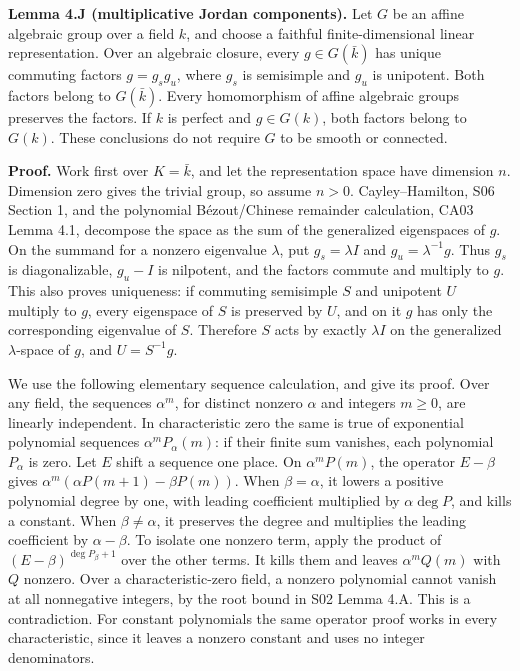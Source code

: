 \documentclass[11pt,a4paper,openany]{report}
\begin{document}
\textbf{Lemma 4.J (multiplicative Jordan components).} Let \(G\) be an affine algebraic group over a field \(k\), and choose a faithful finite-dimensional linear representation. Over an algebraic closure, every \(g\in G(\bar k)\) has unique commuting factors \(g=g_sg_u\), where \(g_s\) is semisimple and \(g_u\) is unipotent. Both factors belong to \(G(\bar k)\). Every homomorphism of affine algebraic groups preserves the factors. If \(k\) is perfect and \(g\in G(k)\), both factors belong to \(G(k)\). These conclusions do not require \(G\) to be smooth or connected.

\textbf{Proof.} Work first over \(K=\bar k\), and let the representation space have dimension \(n\). Dimension zero gives the trivial group, so assume \(n>0\). Cayley--Hamilton, S06 Section 1, and the polynomial Bézout/Chinese remainder calculation, CA03 Lemma 4.1, decompose the space as the sum of the generalized eigenspaces of \(g\). On the summand for a nonzero eigenvalue \(\lambda\), put \(g_s=\lambda I\) and \(g_u=\lambda^{-1}g\). Thus \(g_s\) is diagonalizable, \(g_u-I\) is nilpotent, and the factors commute and multiply to \(g\). This also proves uniqueness: if commuting semisimple \(S\) and unipotent \(U\) multiply to \(g\), every eigenspace of \(S\) is preserved by \(U\), and on it \(g\) has only the corresponding eigenvalue of \(S\). Therefore \(S\) acts by exactly \(\lambda I\) on the generalized \(\lambda\)-space of \(g\), and \(U=S^{-1}g\).

We use the following elementary sequence calculation, and give its proof. Over any field, the sequences \(\alpha^m\), for distinct nonzero \(\alpha\) and integers \(m\geq0\), are linearly independent. In characteristic zero the same is true of exponential polynomial sequences \(\alpha^mP_\alpha(m)\): if their finite sum vanishes, each polynomial \(P_\alpha\) is zero. Let \(E\) shift a sequence one place. On \(\alpha^mP(m)\), the operator \(E-\beta\) gives \(\alpha^m(\alpha P(m+1)-\beta P(m))\). When \(\beta=\alpha\), it lowers a positive polynomial degree by one, with leading coefficient multiplied by \(\alpha\deg P\), and kills a constant. When \(\beta\ne\alpha\), it preserves the degree and multiplies the leading coefficient by \(\alpha-\beta\). To isolate one nonzero term, apply the product of \((E-\beta)^{\deg P_\beta+1}\) over the other terms. It kills them and leaves \(\alpha^mQ(m)\) with \(Q\) nonzero. Over a characteristic-zero field, a nonzero polynomial cannot vanish at all nonnegative integers, by the root bound in S02 Lemma 4.A. This is a contradiction. For constant polynomials the same operator proof works in every characteristic, since it leaves a nonzero constant and uses no integer denominators.
\end{document}

